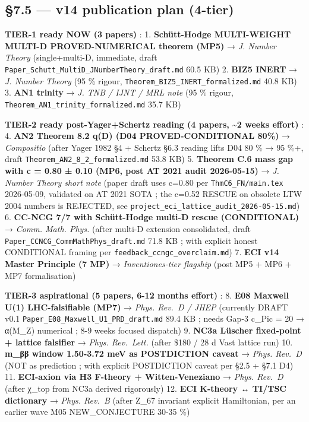\documentclass[
  11pt,
  a4paper,
]{article}
\begin{document}
\hypertarget{v14-publication-plan-4-tier}{%
\subsection{§7.5 --- v14 publication plan (4-tier)}\label{v14-publication-plan-4-tier}}

\textbf{TIER-1 ready NOW (3 papers)} :
1. \textbf{Schütt-Hodge MULTI-WEIGHT MULTI-D PROVED-NUMERICAL theorem (MP5)} → \emph{J. Number Theory} (single+multi-D, immediate, draft \texttt{Paper\_Schutt\_MultiD\_JNumberTheory\_draft.md} 60.5 KB)
2. \textbf{BIZ5 INERT} → \emph{J. Number Theory} (95 \% rigour, \texttt{Theorem\_BIZ5\_INERT\_formalized.md} 40.8 KB)
3. \textbf{AN1 trinity} → \emph{J. TNB / IJNT / MRL note} (95 \% rigour, \texttt{Theorem\_AN1\_trinity\_formalized.md} 35.7 KB)

\textbf{TIER-2 ready post-Yager+Schertz reading (4 papers, \textasciitilde2 weeks effort)} :
4. \textbf{AN2 Theorem 8.2 q(D) (D04 PROVED-CONDITIONAL 80\%)} → \emph{Compositio} (after Yager 1982 §4 + Schertz §6.3 reading lifts D04 80 \% → 95 \%+, draft \texttt{Theorem\_AN2\_8\_2\_formalized.md} 53.8 KB)
5. \textbf{Theorem C.6 mass gap with c = 0.80 ± 0.10 (MP6, post AT 2021 audit 2026-05-15)} → \emph{J. Number Theory short note} (paper draft uses c=0.80 per \texttt{ThmC6\_FN/main.tex} 2026-05-09, validated on AT 2021 SOTA ; the c=0.52 RESCUE on obsolete LTW 2004 numbers is REJECTED, see \texttt{project\_eci\_lattice\_audit\_2026-05-15.md})
6. \textbf{CC-NCG 7/7 with Schütt-Hodge multi-D rescue (CONDITIONAL)} → \emph{Comm. Math. Phys.} (after multi-D extension consolidated, draft \texttt{Paper\_CCNCG\_CommMathPhys\_draft.md} 71.8 KB ; with explicit honest CONDITIONAL framing per \texttt{feedback\_ccngc\_overclaim.md})
7. \textbf{ECI v14 Master Principle (7 MP)} → \emph{Inventiones-tier flagship} (post MP5 + MP6 + MP7 formalisation)

\textbf{TIER-3 aspirational (5 papers, 6-12 months effort)} :
8. \textbf{E08 Maxwell U(1) LHC-falsifiable (MP7)} → \emph{Phys. Rev.~D / JHEP} (currently DRAFT v0.1 \texttt{Paper\_E08\_Maxwell\_U1\_PRD\_draft.md} 89.4 KB ; needs Gap-3 c\_Pic = 20 → α(M\_Z) numerical ; 8-9 weeks focused dispatch)
9. \textbf{NC3a Lüscher fixed-point + lattice falsifier} → \emph{Phys. Rev.~Lett.} (after \$180 / 28 d Vast lattice run)
10. \textbf{m\_ββ window 1.50-3.72 meV as POSTDICTION caveat} → \emph{Phys. Rev.~D} (NOT as prediction ; with explicit POSTDICTION caveat per §2.5 + §7.1 D4)
11. \textbf{ECI-axion via H3 F-theory + Witten-Veneziano} → \emph{Phys. Rev.~D} (after χ\_top from NC3a derived rigorously)
12. \textbf{ECI K-theory ↔ TI/TSC dictionary} → \emph{Phys. Rev.~B} (after Z\_67 invariant explicit Hamiltonian, per an earlier wave M05 NEW\_CONJECTURE 30-35 \%)
\end{document}
